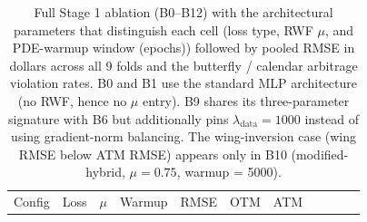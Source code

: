 \documentclass[
  11pt,
]{article}
\begin{document}
\begin{longtable}[]{@{}
  >{\raggedright\arraybackslash}p{}
  >{\raggedright\arraybackslash}p{}
  >{\raggedright\arraybackslash}p{}
  >{\raggedright\arraybackslash}p{}
  >{\raggedright\arraybackslash}p{}
  >{\raggedright\arraybackslash}p{}
  >{\raggedright\arraybackslash}p{}
  >{\raggedright\arraybackslash}p{}
  >{\raggedright\arraybackslash}p{}
  >{\raggedright\arraybackslash}p{}
  >{\raggedright\arraybackslash}p{}@{}}
\caption{Full Stage 1 ablation (B0--B12) with the architectural
parameters that distinguish each cell (loss type, RWF \(\mu\), and
PDE-warmup window (epochs)) followed by pooled RMSE in dollars across
all 9 folds and the butterfly / calendar arbitrage violation rates. B0
and B1 use the standard MLP architecture (no RWF, hence no \(\mu\)
entry). B9 shares its three-parameter signature with B6 but additionally
pins \(\lambda_\mathrm{data}=1000\) instead of using gradient-norm
balancing. The wing-inversion case (wing RMSE below ATM RMSE) appears
only in B10 (modified-hybrid, \(\mu = 0.75\), warmup =
5000).}\label{tbl-stage1}\tabularnewline
\toprule\noalign{}
\begin{minipage}[b]{\linewidth}\raggedright
Config
\end{minipage} & \begin{minipage}[b]{\linewidth}\raggedright
Loss
\end{minipage} & \begin{minipage}[b]{\linewidth}\raggedright
\(\mu\)
\end{minipage} & \begin{minipage}[b]{\linewidth}\raggedright
Warmup
\end{minipage} & \begin{minipage}[b]{\linewidth}\raggedright
RMSE
\end{minipage} & \begin{minipage}[b]{\linewidth}\raggedright
OTM
\end{minipage} & \begin{minipage}[b]{\linewidth}\raggedright
ATM
\end{minipage} & \begin{minipage}[b]{\linewidth}\raggedright

\end{minipage}
\end{longtable}
\end{document}
